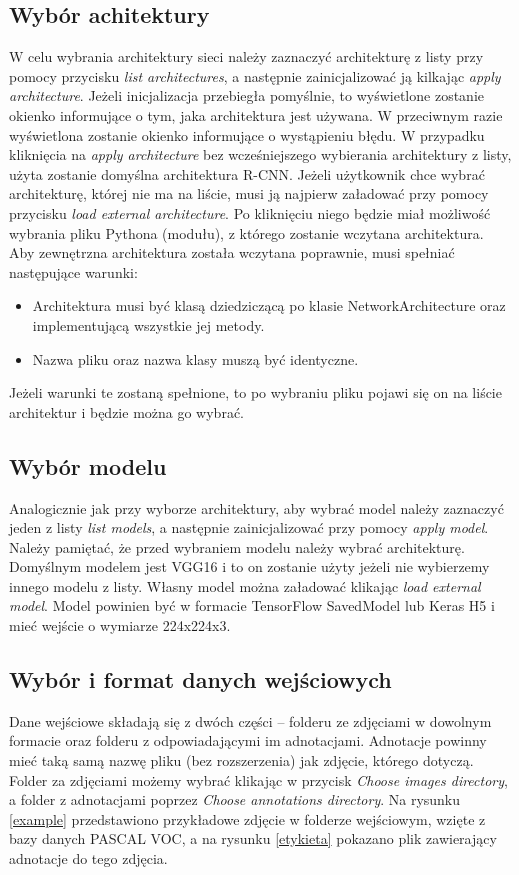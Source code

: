 \documentclass[a4paper,twoside,12pt]{book}
\begin{document}
{\subsection{Wybór achitektury}
{W celu wybrania architektury sieci należy zaznaczyć architekturę z listy przy pomocy przycisku \emph{list architectures}, a następnie zainicjalizować ją kilkając \emph{apply architecture}. Jeżeli inicjalizacja przebiegła pomyślnie, to wyświetlone zostanie okienko informujące o tym, jaka architektura jest używana. W przeciwnym razie wyświetlona zostanie okienko informujące o wystąpieniu błędu. W przypadku kliknięcia na \emph{apply architecture} bez wcześniejszego wybierania architektury z listy, użyta zostanie domyślna architektura R-CNN. Jeżeli użytkownik chce wybrać architekturę, której nie ma na liście, musi ją najpierw załadować przy pomocy przycisku  \emph{load external architecture}. Po kliknięciu niego będzie miał możliwość wybrania pliku Pythona (modułu), z którego zostanie wczytana architektura. Aby zewnętrzna architektura została wczytana poprawnie, musi spełniać następujące warunki:
\begin{itemize}
\item Architektura musi być klasą dziedziczącą po klasie NetworkArchitecture oraz implementującą wszystkie jej metody.
\item Nazwa pliku oraz nazwa klasy muszą być identyczne.
\end{itemize}
Jeżeli warunki te zostaną spełnione, to po wybraniu pliku pojawi się on na liście architektur i będzie można go wybrać.}
\subsection{Wybór modelu}
{Analogicznie jak przy wyborze architektury, aby wybrać model należy zaznaczyć jeden z listy \emph{list models}, a następnie zainicjalizować przy pomocy \emph{apply model}. Należy pamiętać, że przed wybraniem modelu należy wybrać architekturę. Domyślnym modelem jest VGG16 i to on zostanie użyty jeżeli nie wybierzemy innego modelu z listy. Własny model można załadować klikając \emph{load external model}. Model powinien być w formacie TensorFlow SavedModel lub Keras H5 i mieć wejście o wymiarze 224x224x3.}
\subsection{Wybór i format danych wejściowych}
{Dane wejściowe składają się z dwóch części – folderu ze zdjęciami w dowolnym formacie oraz folderu z odpowiadającymi im adnotacjami. Adnotacje powinny mieć taką samą nazwę pliku (bez rozszerzenia) jak zdjęcie, którego dotyczą. Folder za zdjęciami możemy wybrać klikając w przycisk \emph{Choose images directory}, a folder z adnotacjami poprzez \emph{Choose annotations directory}. 
Na rysunku \ref{example} przedstawiono przykładowe zdjęcie w folderze wejściowym, wzięte z bazy danych PASCAL VOC, a na rysunku \ref{etykieta} pokazano plik zawierający adnotacje do tego zdjęcia.}

}
\end{document}
